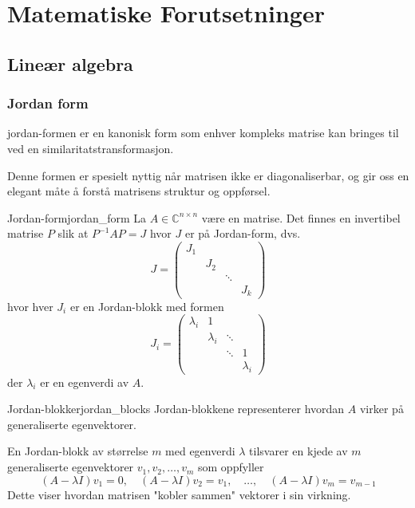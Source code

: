 \chapter{Matematiske Forutsetninger}
\label{chap:preliminaries}

\section{Lineær algebra}

\subsection{Jordan form}
\gls{jordan}-formen er en kanonisk form som enhver kompleks matrise kan bringes til ved en similaritatstransformasjon.

Denne formen er spesielt nyttig når matrisen ikke er diagonaliserbar, og gir oss en elegant måte å forstå matrisens struktur og oppførsel.

\begin{definition}{Jordan-form}{jordan_form}
	La $A \in \mathbb{C}^{n \times n}$ være en matrise. Det finnes en invertibel matrise $P$ slik at $P^{-1}AP = J$ hvor $J$ er på Jordan-form, dvs.
	\[
		J =
		\begin{pmatrix}
			J_1 &     &        &     \\
			    & J_2 &        &     \\
			    &     & \ddots &     \\
			    &     &        & J_k
		\end{pmatrix}
	\]
	hvor hver $J_i$ er en Jordan-blokk med formen
	\[
		J_i =
		\begin{pmatrix}
			\lambda_i & 1         &        &           \\
			          & \lambda_i & \ddots &           \\
			          &           & \ddots & 1         \\
			          &           &        & \lambda_i
		\end{pmatrix}
	\]
	der $\lambda_i$ er en egenverdi av $A$.
\end{definition}

\begin{remark}{Jordan-blokker}{jordan_blocks}
	Jordan-blokkene representerer hvordan $A$ virker på generaliserte egenvektorer.

	En Jordan-blokk av størrelse $m$ med egenverdi $\lambda$ tilsvarer en kjede av $m$ generaliserte egenvektorer $v_1, v_2, \ldots, v_m$ som oppfyller
	\[
		(A - \lambda I)v_1 = 0, \quad (A - \lambda I)v_2 = v_1, \quad \ldots, \quad (A - \lambda I)v_m = v_{m-1}
	\]
	Dette viser hvordan matrisen "kobler sammen" vektorer i sin virkning.
\end{remark}

